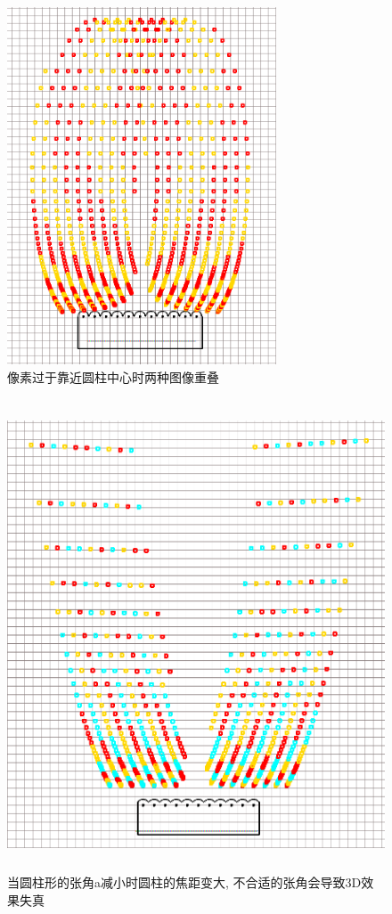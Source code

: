 \documentclass[a4paper, 11pt]{article}
\begin{document}
\begin{CJK}{UTF8}{gbsn}
\begin{figure}[h!]
  \centerline{\includegraphics[width=8cm]{229.png}}
  \caption{像素过于靠近圆柱中心时两种图像重叠}
  \label{fig:229}
\end{figure}

\begin{figure}[h!]
  \centerline{\includegraphics[height=14cm]{231.png}}
  \caption{当圆柱形的张角a减小时圆柱的焦距变大, 不合适的张角会导致3D效果失真}
  \label{fig:231}
\end{figure}


\end{CJK}
\end{document}
